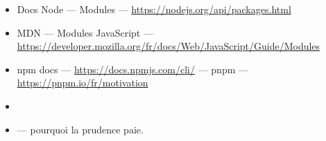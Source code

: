 \begin{ressources}
\begin{itemize}
  \item Docs Node --- Modules --- \url{https://nodejs.org/api/packages.html}
  \item MDN --- Modules JavaScript --- \url{https://developer.mozilla.org/fr/docs/Web/JavaScript/Guide/Modules}
  \item npm docs --- \url{https://docs.npmjs.com/cli/} --- pnpm --- \url{https://pnpm.io/fr/motivation}
  \item {}
  \item {} --- pourquoi la prudence paie.
\end{itemize}
\end{ressources}

